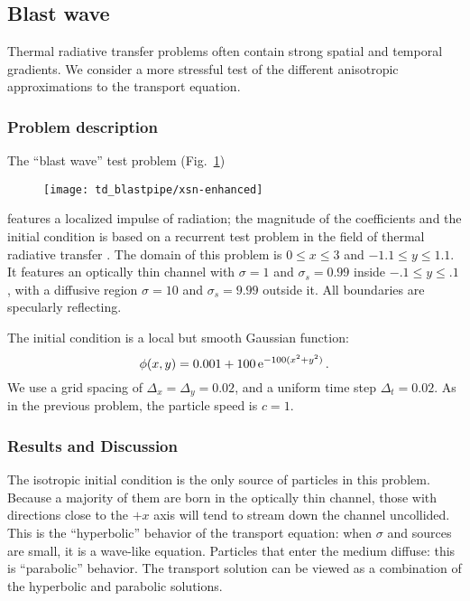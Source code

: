 \clearpage
\subsection{Blast wave}\label{sec:tdBlastwave}

Thermal radiative transfer problems often contain strong spatial and temporal
gradients. We consider a more stressful test of the different anisotropic
approximations to the transport equation.

\subsubsection{Problem description}

The ``blast wave'' test problem (Fig.~\ref{fig:tdBlastwaveXsn})
%
\begin{figure}[htb]
  \centering
  \texttt{[image: td\_blastpipe/xsn-enhanced]}
  \label{fig:tdBlastwaveXsn}
\end{figure}
%
features a localized impulse of radiation; the
magnitude of the coefficients and the initial condition is based on a recurrent
test problem in the field
of thermal radiative transfer \cite{Kno1999a,Kno2001,Rau2005,Ols2007}. The
domain of this problem is $0 \le x \le 3$ and $-1.1 \le y \le 1.1$.
It features an optically thin channel with $\sigma=1$ and $\sigma_s=0.99$ inside
$-.1 \le y \le .1$, with a diffusive region $\sigma=10$ and $\sigma_s=9.99$
outside it. All boundaries are specularly reflecting.

The initial condition is a local but smooth Gaussian function:
\begin{equation*}
  \phi(x,y) = 0.001 + 100 \mathop{}\!\mathrm{e}^{-100 (x^2 + y^2) }\,.
\end{equation*}
We use a grid spacing of $\Delta_x=\Delta_y=0.02$, and a uniform time step
$\Delta_t=0.02$. As in the previous problem, the particle speed is $c=1$.

\subsubsection{Results and Discussion}

The isotropic initial condition is the only source of particles in this
problem. Because a majority of them are born in the optically thin channel,
those with directions close to the $+x$ axis will tend to stream down the
channel uncollided. This is the ``hyperbolic'' behavior of the transport
equation: when $\sigma$ and sources are small, it is a wave-like equation.
Particles that enter the medium diffuse: this is ``parabolic'' behavior. The
transport solution can be viewed as a combination of the hyperbolic and
parabolic solutions.

